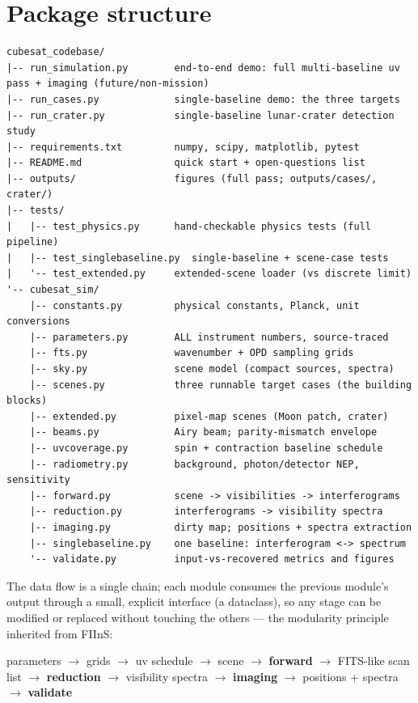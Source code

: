\documentclass[11pt]{article}
\begin{document}
\section{Package structure}

\begin{verbatim}
cubesat_codebase/
|-- run_simulation.py        end-to-end demo: full multi-baseline uv pass + imaging (future/non-mission)
|-- run_cases.py             single-baseline demo: the three targets
|-- run_crater.py            single-baseline lunar-crater detection study
|-- requirements.txt         numpy, scipy, matplotlib, pytest
|-- README.md                quick start + open-questions list
|-- outputs/                 figures (full pass; outputs/cases/, crater/)
|-- tests/
|   |-- test_physics.py      hand-checkable physics tests (full pipeline)
|   |-- test_singlebaseline.py  single-baseline + scene-case tests
|   '-- test_extended.py     extended-scene loader (vs discrete limit)
'-- cubesat_sim/
    |-- constants.py         physical constants, Planck, unit conversions
    |-- parameters.py        ALL instrument numbers, source-traced
    |-- fts.py               wavenumber + OPD sampling grids
    |-- sky.py               scene model (compact sources, spectra)
    |-- scenes.py            three runnable target cases (the building blocks)
    |-- extended.py          pixel-map scenes (Moon patch, crater)
    |-- beams.py             Airy beam; parity-mismatch envelope
    |-- uvcoverage.py        spin + contraction baseline schedule
    |-- radiometry.py        background, photon/detector NEP, sensitivity
    |-- forward.py           scene -> visibilities -> interferograms
    |-- reduction.py         interferograms -> visibility spectra
    |-- imaging.py           dirty map; positions + spectra extraction
    |-- singlebaseline.py    one baseline: interferogram <-> spectrum
    '-- validate.py          input-vs-recovered metrics and figures
\end{verbatim}

The data flow is a single chain; each module consumes the previous module's
output through a small, explicit interface (a dataclass), so any stage can be
modified or replaced without touching the others --- the modularity principle
inherited from FIInS:

\begin{center}\sffamily\small
parameters $\rightarrow$ grids $\rightarrow$ uv schedule $\rightarrow$ scene
$\rightarrow$ \textbf{forward} $\rightarrow$ FITS-like scan list
$\rightarrow$ \textbf{reduction} $\rightarrow$ visibility spectra
$\rightarrow$ \textbf{imaging} $\rightarrow$ positions + spectra
$\rightarrow$ \textbf{validate}
\end{center}
\end{document}
